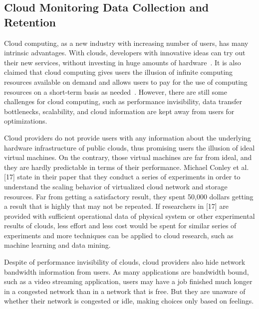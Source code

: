 \subsection{Cloud Monitoring Data Collection and Retention}

Cloud computing, as a new industry with increasing number of users, has many intrinsic advantages. With clouds, developers with innovative ideas can try out their new services, without investing in huge amounts of hardware~\cite{Armbrust2009}. It is also claimed that cloud computing gives users the illusion of infinite computing resources available on demand and allows users to pay for the use of computing resources on a short-term basis as needed~\cite{Armbrust2009}. However, there are still some challenges for cloud computing, such as performance invisibility, data transfer bottlenecks, scalability, and cloud information are kept away from users for optimizations.

  Cloud providers do not provide users with any information about the underlying hardware infrastructure of public clouds, thus promising users the illusion of ideal virtual machines. On the contrary, those virtual machines are far from ideal, and they are hardly predictable in terms of their performance. Michael Conley et al. [17] state in their paper that they conduct a series of experiments in order to understand the scaling behavior of virtualized cloud network and storage resources. Far from getting a satisfactory result, they spent 50,000 dollars getting a result that is highly that may not be repeated. If researchers in [17] are provided with sufficient operational data of physical system or other experimental results of clouds, less effort and less cost would be spent for similar series of experiments and more techniques can be applied to cloud research, such as machine learning and data mining.

  Despite of performance invisibility of clouds, cloud providers also hide network bandwidth information from users. As many applications are bandwidth bound, such as a video streaming application, users may have a job finished much longer in a congested network than in a network that is free. But they are unaware of whether their network is congested or idle, making choices only based on feelings. 


